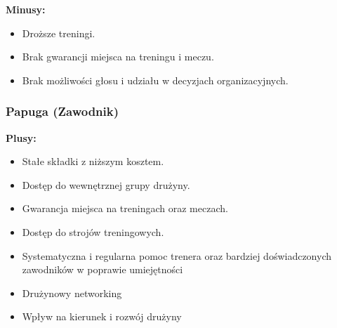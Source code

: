 \documentclass{article}
\begin{document}
\textbf{Minusy:}
\begin{itemize}
    \item Droższe treningi.
    \item Brak gwarancji miejsca na treningu i meczu.
    \item Brak możliwości głosu i udziału w decyzjach organizacyjnych.
\end{itemize}

\subsubsection{Papuga (Zawodnik)}

\textbf{Plusy:}
\begin{itemize}
    \item Stałe składki z niższym kosztem.
    \item Dostęp do wewnętrznej grupy drużyny.
    \item Gwarancja miejsca na treningach oraz meczach.
    \item Dostęp do strojów treningowych.
    \item Systematyczna i regularna pomoc trenera oraz bardziej doświadczonych zawodników w poprawie umiejętności
    \item Drużynowy networking
    \item Wpływ na kierunek i rozwój drużyny
\end{itemize}

\end{document}
